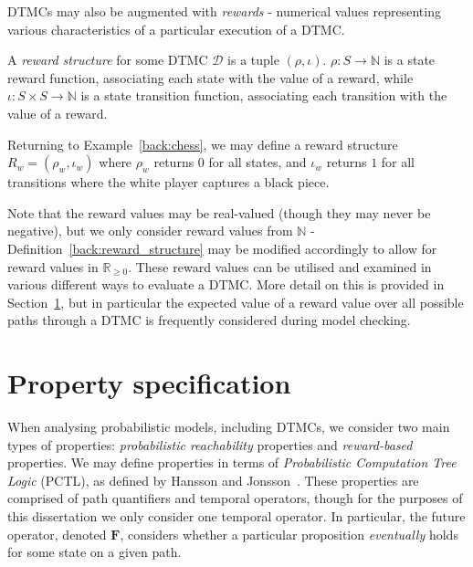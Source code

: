 DTMCs may also be augmented with \emph{rewards} - numerical values representing various characteristics of a particular execution of a DTMC.

\begin{definition}
\label{back:reward_structure}

A \emph{reward structure} for some DTMC $\mathcal{D}$ is a tuple $(\rho, \iota)$. $\rho : S \rightarrow \mathbb{N}$ is a state reward function, associating each state with the value of a reward, while $\iota : S \times S \rightarrow \mathbb{N}$ is a state transition function, associating each transition with the value of a reward.
\end{definition}

\begin{example}\label{rew:eg}
Returning to Example~\ref{back:chess}, we may define a reward structure $R_w = (\rho_w, \iota_w)$ where $\rho_w$ returns $0$ for all states, and $\iota_w$ returns $1$ for all transitions where the white player captures a black piece.
\end{example}

Note that the reward values may be real-valued (though they may never be negative), but we only consider reward values from $\mathbb{N}$ - Definition~\ref{back:reward_structure} may be modified accordingly to allow for reward values in $\mathbb{R}_{\geq0}$. These reward values can be utilised and examined in various different ways to evaluate a DTMC. More detail on this is provided in Section~\ref{back:prop_spec}, but in particular the expected value of a reward value over all possible paths through a DTMC is frequently considered during model checking.


\section{Property specification}
\label{back:prop_spec}

When analysing probabilistic models, including DTMCs, we consider two main types of properties: \emph{probabilistic reachability} properties and \emph{reward-based} properties. We may define properties in terms of \emph{Probabilistic Computation Tree Logic} (PCTL), as defined by Hansson and Jonsson~\cite{hansson_logic_1994}. These properties are comprised of path quantifiers and temporal operators, though for the purposes of this dissertation we only consider one temporal operator. In particular, the future operator, denoted $\mathbf{F}$, considers whether a particular proposition \emph{eventually} holds for some state on a given path.


